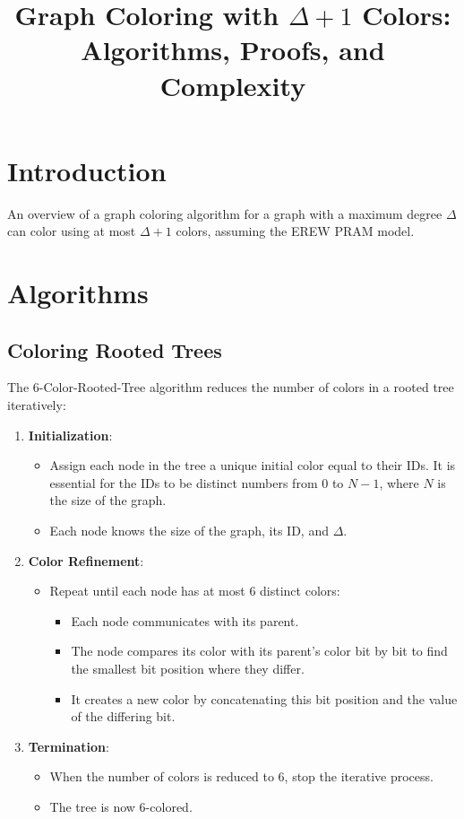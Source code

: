 \documentclass{article}
\title{Graph Coloring with $\Delta + 1$ Colors: Algorithms, Proofs, and Complexity}
\author{}
\date{}
\begin{document}
\maketitle

\section{Introduction}
An overview of a graph coloring algorithm for a graph with a maximum degree $\Delta$ can color using at most $\Delta + 1$ colors, assuming the EREW PRAM model.

\section{Algorithms}
\subsection{Coloring Rooted Trees}
The 6-Color-Rooted-Tree algorithm reduces the number of colors in a rooted tree iteratively:

\begin{enumerate}
    \item \textbf{Initialization}:
    \begin{itemize}
        \item Assign each node in the tree a unique initial color equal to their IDs. It is essential for the IDs to be distinct numbers from $0$ to $N - 1$, where $N$ is the size of the graph.
        \item Each node knows the size of the graph, its ID, and $\Delta$.
    \end{itemize}
    \item \textbf{Color Refinement}:
    \begin{itemize}
        \item Repeat until each node has at most $6$ distinct colors:
        \begin{itemize}
            \item Each node communicates with its parent.
            \item The node compares its color with its parent’s color bit by bit to find the smallest bit position where they differ.
            \item It creates a new color by concatenating this bit position and the value of the differing bit.
        \end{itemize}
    \end{itemize}
    \item \textbf{Termination}:
    \begin{itemize}
        \item When the number of colors is reduced to $6$, stop the iterative process.
        \item The tree is now 6-colored.
    \end{itemize}
\end{enumerate}
\end{document}
